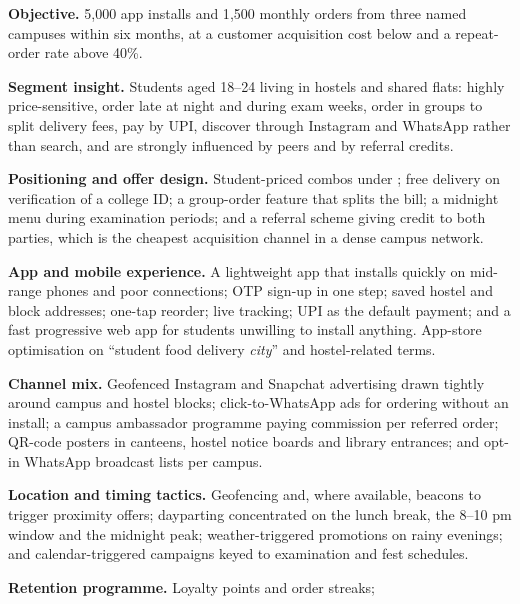 \begin{qlist}
\begin{apts}
\item \textbf{Objective.} 5{,}000 app installs and 1{,}500 monthly orders from
      three named campuses within six months, at a customer acquisition cost
      below  and a repeat-order rate above 40\%.
\item \textbf{Segment insight.} Students aged 18--24 living in hostels and
      shared flats: highly price-sensitive, order late at night and during exam
      weeks, order in groups to split delivery fees, pay by UPI, discover
      through Instagram and WhatsApp rather than search, and are strongly
      influenced by peers and by referral credits.
\item \textbf{Positioning and offer design.} Student-priced combos under
      ; free delivery on verification of a college ID; a group-order
      feature that splits the bill; a midnight menu during examination periods;
      and a referral scheme giving credit to both parties, which is the
      cheapest acquisition channel in a dense campus network.
\item \textbf{App and mobile experience.} A lightweight app that installs
      quickly on mid-range phones and poor connections; OTP sign-up in one
      step; saved hostel and block addresses; one-tap reorder; live tracking;
      UPI as the default payment; and a fast progressive web app for students
      unwilling to install anything. App-store optimisation on ``student food
      delivery \emph{city}'' and hostel-related terms.
\item \textbf{Channel mix.} Geofenced Instagram and Snapchat advertising drawn
      tightly around campus and hostel blocks; click-to-WhatsApp ads for
      ordering without an install; a campus ambassador programme paying
      commission per referred order; QR-code posters in canteens, hostel notice
      boards and library entrances; and opt-in WhatsApp broadcast lists per
      campus.
\item \textbf{Location and timing tactics.} Geofencing and, where available,
      beacons to trigger proximity offers; dayparting concentrated on the
      lunch break, the 8--10 pm window and the midnight peak; weather-triggered
      promotions on rainy evenings; and calendar-triggered campaigns keyed to
      examination and fest schedules.
\item \textbf{Retention programme.} Loyalty points and order streaks;

\end{apts}
\end{qlist}
